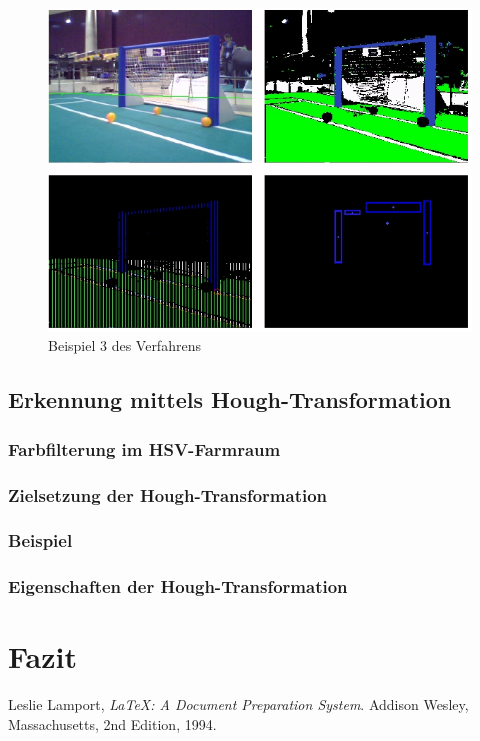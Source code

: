 \documentclass[a4paper,12pt]{article}
\begin{document}
\begin{figure}[H]
\includegraphics[scale=0.8]{example-detection4.png}
\caption{Beispiel 3 des Verfahrens}
\label{fig:example4}
\end{figure}

\subsection{Erkennung mittels Hough-Transformation}
\subsubsection{Farbfilterung im HSV-Farmraum}
\subsubsection{Zielsetzung der Hough-Transformation}
\subsubsection{Beispiel}
\subsubsection{Eigenschaften der Hough-Transformation}

\section{Fazit}


\begin{thebibliography}{9}

  Leslie Lamport,
  \emph{\LaTeX: A Document Preparation System}.
  Addison Wesley, Massachusetts,
  2nd Edition,
  1994.

\end{thebibliography}

\listoffigures
\end{document}
